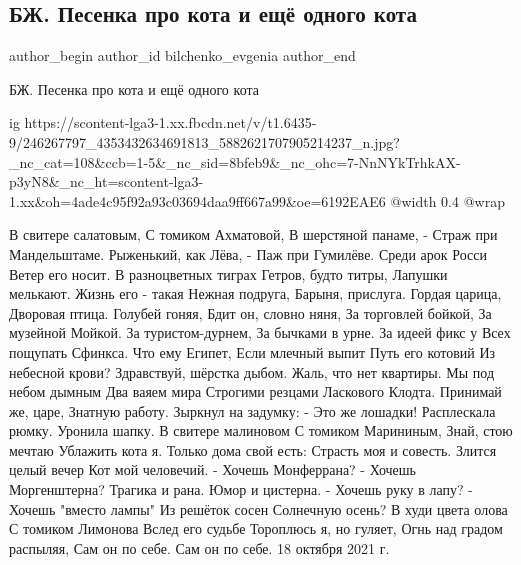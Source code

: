  
 
 
 
 
 
\subsection{БЖ. Песенка про кота и ещё одного кота}
\label{sec:18_10_2021.fb.bilchenko_evgenia.5.pesenka_pro_kota}
 
\ifcmt
 author_begin
   author_id bilchenko_evgenia
 author_end
\fi

БЖ. Песенка про кота и ещё одного кота

\ifcmt
  ig https://scontent-lga3-1.xx.fbcdn.net/v/t1.6435-9/246267797_4353432634691813_5882621707905214237_n.jpg?_nc_cat=108&ccb=1-5&_nc_sid=8bfeb9&_nc_ohc=7-NnNYkTrhkAX-p3yN8&_nc_ht=scontent-lga3-1.xx&oh=4ade4c95f92a93c03694daa9ff667a99&oe=6192EAE6
  @width 0.4
  @wrap 
\fi

В свитере салатовым,
С томиком Ахматовой,
В шерстяной панаме, -
Страж при Мандельштаме.
Рыженький, как Лёва, -
Паж при Гумилёве.
Среди арок Росси
Ветер его носит.
В разноцветных тиграх
Гетров, будто титры,
Лапушки мелькают.
Жизнь его - такая
Нежная подруга,
Барыня, прислуга.
Гордая царица,
Дворовая птица.
Голубей гоняя,
Бдит он, словно няня,
За торговлей бойкой,
За музейной Мойкой.
За туристом-дурнем,
За бычками в урне.
За идеей фикс у
Всех пощупать Сфинкса.
Что ему Египет,
Если млечный выпит
Путь его котовий
Из небесной крови?
Здравствуй, шёрстка дыбом.
Жаль, что нет квартиры.
Мы под небом дымным 
Два ваяем мира
Строгими резцами
Ласкового Клодта.
Принимай же, царе,
Знатную работу.
Зыркнул на задумку:
- Это же лошадки!
Расплескала рюмку.
Уронила шапку.
В свитере малиновом
С томиком Марининым,
Знай, стою мечтаю
Ублажить кота я.
Только дома свой есть:
Страсть моя и совесть.
Злится целый вечер
Кот мой человечий.
- Хочешь Монферрана?
- Хочешь Моргенштерна?
Трагика и рана.
Юмор и цистерна.
- Хочешь руку в лапу?
- Хочешь "вместо лампы"
Из решёток сосен
Солнечную осень?
В худи цвета олова
С томиком Лимонова
Вслед его судьбе
Тороплюсь я, но  гуляет,
Огнь над градом распыляя,
Сам он по себе.
Сам он по себе.
18 октября 2021 г.

